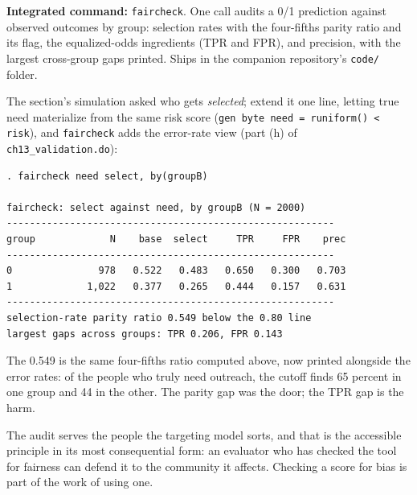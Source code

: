 \documentclass[
    a4paper,
    fontsize=10pt,
    twoside=true,
    numbers=noenddot,
]{kaobook}
\begin{document}
\begin{kaobox}[frametitle=Package Integration: \texttt{faircheck}]
\textbf{Integrated command:} \texttt{faircheck}. One call audits a 0/1 prediction against observed outcomes by group: selection rates with the four-fifths parity ratio and its flag, the equalized-odds ingredients (TPR and FPR), and precision, with the largest cross-group gaps printed. Ships in the companion repository's \texttt{code/} folder.
\end{kaobox}

The section's simulation asked who gets \emph{selected}; extend it one line, letting true need materialize from the same risk score (\texttt{gen byte need = runiform() < risk}), and \texttt{faircheck} adds the error-rate view (part (h) of \texttt{ch13\_validation.do}):
\par
{\footnotesize
\begin{verbatim}
. faircheck need select, by(groupB)

faircheck: select against need, by groupB (N = 2000)
---------------------------------------------------------
group             N    base  select     TPR     FPR    prec
---------------------------------------------------------
0               978   0.522   0.483   0.650   0.300   0.703
1             1,022   0.377   0.265   0.444   0.157   0.631
---------------------------------------------------------
selection-rate parity ratio 0.549 below the 0.80 line
largest gaps across groups: TPR 0.206, FPR 0.143
\end{verbatim}
}
The 0.549 is the same four-fifths ratio computed above, now printed alongside the error rates: of the people who truly need outreach, the cutoff finds 65 percent in one group and 44 in the other. The parity gap was the door; the TPR gap is the harm.

The audit serves the people the targeting model sorts, and that is the accessible principle in its most consequential form: an evaluator who has checked the tool for fairness can defend it to the community it affects. Checking a score for bias is part of the work of using one.
\end{document}
